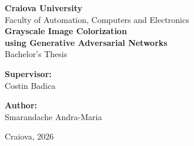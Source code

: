 \documentclass[12pt, a4paper, oneside]{report}
\begin{document}


\begin{titlepage}
    \centering
    \vspace*{2cm}

    {\Large \textbf{Craiova University}}\\[0.5cm]
    {\large Faculty of Automation, Computers and Electronics}\\[3cm]

    {\Huge \textbf{Grayscale Image Colorization\\using Generative Adversarial Networks}}\\[2cm]

    {\large Bachelor's Thesis}\\[2cm]

    \begin{minipage}{0.45\textwidth}
        \begin{flushleft}
            \textbf{Supervisor:}\\
            Costin Badica
        \end{flushleft}
    \end{minipage}
    \begin{minipage}{0.45\textwidth}
        \begin{flushright}
            \textbf{Author:}\\
            Smarandache Andra-Maria
        \end{flushright}
    \end{minipage}

    \vfill
    {\large Craiova, 2026}
\end{titlepage}


\begin{abstract}
%
\end{abstract}

\tableofcontents
\listoffigures
\listoftables
\end{document}
